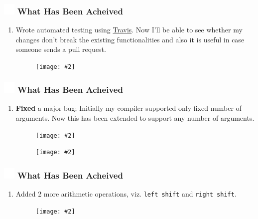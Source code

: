 \documentclass{beamer}
\newcommand{\iph}[2]{
    \texttt{[image: \#2]}
}
\newcommand{\ft}[1]{
  \frametitle{\includegraphics[height=0.55cm, width=0.55cm, keepaspectratio]{assets/tiger.png} #1}
}
\newcounter{saveenumi}
\newcommand{\seti}{\setcounter{saveenumi}{\value{enumi}}}
\newcommand{\conti}{\setcounter{enumi}{\value{saveenumi}}}
\begin{document}
\begin{frame}[fragile]
  \ft{What Has Been Acheived}
  \begin{enumerate}
    \conti
    \item Wrote automated testing using \href{https://travis-ci.org/sourabh2311/btp}{Travis}. Now I'll be able to see whether my changes don't break the existing functionalities and also it is useful in case someone sends a pull request.
    \begin{figure}
    \centering
    \iph{0.80}{assets/travis.png}
    \label{fig:travis}
    \end{figure}
    \seti
  \end{enumerate}
\end{frame}

\begin{frame}[fragile]
  \ft{What Has Been Acheived}
  \begin{enumerate}
    \conti
    \item \textbf{Fixed} a major bug; Initially my compiler supported only fixed number of arguments. Now this has been extended to support any number of arguments. 
    \begin{figure}
    \centering
    \iph{0.80}{assets/funargs.png}
    \label{fig:funargs}
    \end{figure}
    \begin{figure}
    \centering
    \iph{0.80}{assets/gitfunargs.png}
    \label{fig:gitfunargs}
    \end{figure}
    \seti
  \end{enumerate}
\end{frame}

\begin{frame}[fragile]
  \ft{What Has Been Acheived}
  \begin{enumerate}
    \conti
    \item Added 2 more arithmetic operations, viz. \texttt{left shift} and \texttt{right shift}. 
    \begin{figure}
    \centering
    \iph{0.80}{assets/shiftoperations.png}
    \label{fig:shiftoperations}
    \end{figure}
    \seti
  \end{enumerate}
\end{frame}
\end{document}
